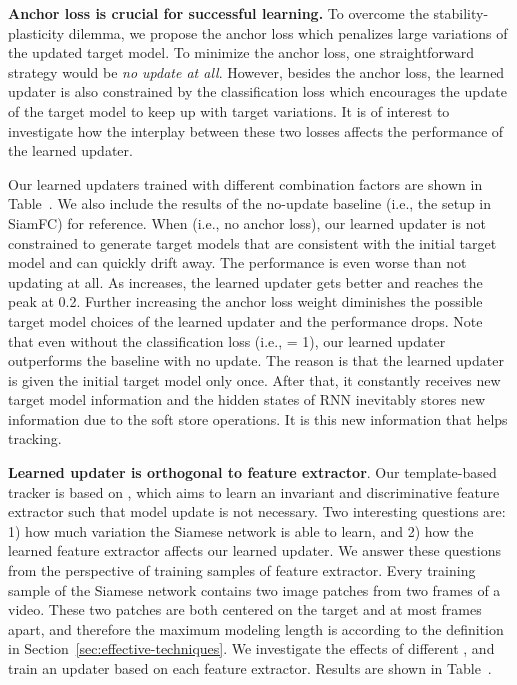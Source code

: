 \documentclass[journal]{IEEEtran}
\begin{document}
\textbf{Anchor loss is crucial for successful learning.} To overcome the stability-plasticity dilemma, we propose the anchor loss which penalizes large variations of the updated target model. To minimize the anchor loss, one straightforward strategy would be \emph{no update at all}. However, besides the anchor loss, the learned updater is also constrained by the classification loss which encourages the update of the target model to keep up with target variations. It is of interest to investigate how the interplay between these two losses affects the performance of the learned updater.

Our learned updaters trained with different combination factors  are shown in Table~. We also include the results of the no-update baseline (i.e., the setup in SiamFC\cite{bertinetto2016fully}) for reference. When  (i.e., no anchor loss), our learned updater is not constrained to generate target models that are consistent with the initial target model and can quickly drift away. The performance is even worse than not updating at all. As  increases, the learned updater gets better and reaches the peak at 0.2. Further increasing the anchor loss weight diminishes the possible target model choices of the learned updater and the performance drops. Note that even without the classification loss (i.e.,  = 1), our learned updater outperforms the baseline with no update. The reason is that the learned updater is given the initial target model only once. After that, it constantly receives new target model information and the hidden states of RNN inevitably stores new information due to the soft store operations. It is this new information that helps tracking.

\textbf{Learned updater is orthogonal to feature extractor}. Our template-based tracker is based on \cite{bertinetto2016fully}, which aims to learn an invariant and discriminative feature extractor such that model update is not necessary. Two interesting questions are: 1) how much variation the Siamese network is able to learn, and 2) how the learned feature extractor affects our learned updater. We answer these questions from the perspective of training samples of feature extractor. Every training sample of the Siamese network contains two image patches from two frames of a video. These two patches are both centered on the target and at most  frames apart, and therefore the maximum modeling length is  according to the definition in Section~\ref{sec:effective-techniques}. We investigate the effects of different , and train an updater based on each feature extractor. Results are shown in Table~.     
\end{document}
